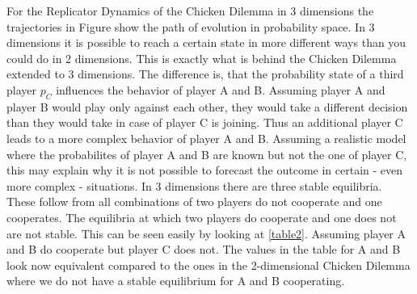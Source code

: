 \documentclass[11pt]{article}
\begin{document}
For the Replicator Dynamics of the Chicken Dilemma in 3 dimensions the trajectories in Figure show the path of evolution in probability space. In 3 dimensions it is possible to reach a certain state in more different ways than you could do in 2 dimensions. This is exactly what is behind the Chicken Dilemma extended to 3 dimensions. The difference is, that the probability state of a third player $p_C$ influences the behavior of player A and B. Assuming player A and player B would play only against each other, they would take a different decision than they would take in case of player C is joining. Thus an additional player C leads to a more complex behavior of player A and B. Assuming a realistic model where the probabilites of player A and B are known but not the one of player C, this may explain why it is not possible to forecast the outcome in certain - even  more complex - situations. 
In 3 dimensions there are three stable equilibria. These follow from all combinations of two players do not cooperate and one cooperates. The equilibria at which two players do cooperate and one does not are not stable. This can be seen easily by looking at \ref{table2}. Assuming player A and B do cooperate but player C does not. The values in the table for A and B look now equivalent compared to the ones in the 2-dimensional Chicken Dilemma where we do not have a stable equilibrium for A and B cooperating.
\newline
\end{document}
